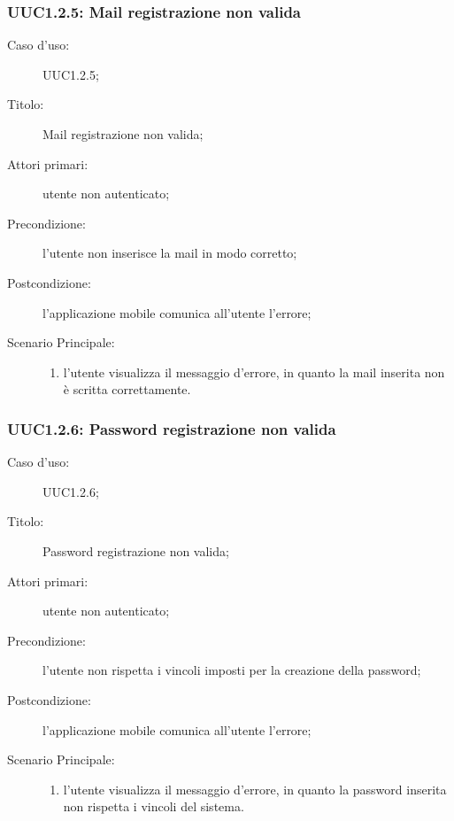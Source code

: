 \documentclass[../../../analisi-dei-requisiti.tex]{subfiles}
\begin{document}
\subsubsection{UUC1.2.5: Mail registrazione non valida}%
\label{subs:UUC1.2.5}
\begin{description}
  \item[Caso d’uso:] UUC1.2.5;
  \item[Titolo:] Mail registrazione non valida;
  \item[Attori primari:] utente non autenticato;
  \item[Precondizione:] l'utente non inserisce la mail in modo corretto;
  \item[Postcondizione:] l'applicazione mobile comunica all'utente l'errore;
  \item[Scenario Principale:]
        \begin{enumerate}
          \item l'utente visualizza il messaggio d'errore, in quanto la mail inserita non è scritta correttamente.
        \end{enumerate}
\end{description}

\subsubsection{UUC1.2.6: Password registrazione non valida}%
\label{subs:UUC1.2.6}
\begin{description}
  \item[Caso d’uso:] UUC1.2.6;
  \item[Titolo:] Password registrazione non valida;
  \item[Attori primari:] utente non autenticato;
  \item[Precondizione:] l'utente non rispetta i vincoli imposti per la creazione della password;
  \item[Postcondizione:] l'applicazione mobile comunica all'utente l'errore;
  \item[Scenario Principale:]
        \begin{enumerate}
          \item l'utente visualizza il messaggio d'errore, in quanto la password inserita non rispetta i vincoli del sistema.
        \end{enumerate}
\end{description}
\end{document}
